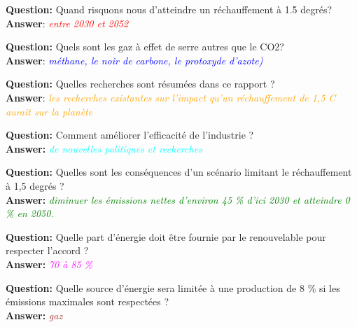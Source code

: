 \documentclass{article}
\begin{document}
{{{\begin{minipage}{\textwidth}
    \vspace{0.1in}
    
    \textbf{Question: }Quand risquons nous d'atteindre un réchauffement à 1.5 degrés? \\
    \textbf{Answer}: \textit{\textcolor{red}{entre 2030 et 2052}}
    
    \vspace{0.1in}
    
    \textbf{Question: }Quels sont les gaz à effet de serre autres que le CO2? \\
    \textbf{Answer}: \textit{\textcolor{blue}{méthane, le noir de carbone, le protoxyde d'azote)}}
    
    \vspace{0.1in}
    
    \textbf{Question: }Quelles recherches sont résumées dans ce rapport ?\\
    \textbf{Answer}: \textit{\textcolor{orange}{les recherches existantes sur l'impact qu'un réchauffement de 1,5 \degree C aurait sur la planète}}
    
    \vspace{0.1in}

    \textbf{Question: }Comment améliorer l'efficacité de l'industrie ? \\
    \textbf{Answer: } \textit{\textcolor{cyan}{de nouvelles politiques et recherches}}
    
    \vspace{0.1in}
    
    \textbf{Question: }Quelles sont les conséquences d'un scénario limitant le réchauffement à 1,5 degrés ?\\
    \textbf{Answer: } \textit{\textcolor{green}{diminuer les émissions nettes d'environ 45 \% d'ici 2030 et atteindre 0 \% en 2050.}}
    \vspace{0.1in}
    
    
    \textbf{Question: }Quelle part d'énergie doit être fournie par le renouvelable pour respecter l'accord ?\\
    \textbf{Answer: } \textit{\textcolor{magenta}{70 à 85 \%}}
    \vspace{0.1in}
    
    \textbf{Question: }Quelle source d'énergie sera limitée à une production de 8 \% si les émissions maximales sont respectées ? \\
    \textbf{Answer: } \textit{\textcolor{brown}{gaz}}
    \vspace{0.1in}

\end{minipage}}}}

  
\end{document}
